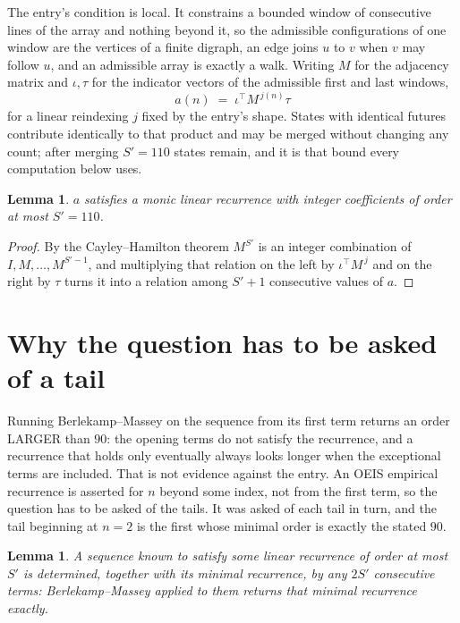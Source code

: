 \documentclass[11pt,a4paper]{article}
\theoremstyle{plain}
\newtheorem{lemma}[theorem]{Lemma}
\theoremstyle{definition}
\begin{document}
The entry's condition is local. It constrains a bounded window of consecutive lines of the
array and nothing beyond it, so the admissible configurations of one window are the vertices of
a finite digraph, an edge joins $u$ to $v$ when $v$ may follow $u$, and an admissible array is
exactly a walk. Writing $M$ for the adjacency matrix and $\iota,\tau$ for the indicator vectors
of the admissible first and last windows,
\[
a(n)\;=\;\iota^{\!\top}M^{\,j(n)}\tau
\]
for a linear reindexing $j$ fixed by the entry's shape. States with identical futures
contribute identically to that product and may be merged without changing any count; after
merging $S'=110$ states remain, and it is that bound every computation below uses.

\begin{lemma}\label{lem:cf}
$a$ satisfies a monic linear recurrence with integer coefficients of order at most $S'=110$.
\end{lemma}

\begin{proof}
By the Cayley--Hamilton theorem $M^{S'}$ is an integer combination of $I,M,\dots,M^{S'-1}$,
and multiplying that relation on the left by $\iota^{\!\top}M^{\,j}$ and on the right by
$\tau$ turns it into a relation among $S'+1$ consecutive values of $a$.
\end{proof}

\section{Why the question has to be asked of a tail}

Running Berlekamp--Massey on the sequence from its first term returns an order LARGER than $90$: the opening terms do not satisfy the recurrence, and a recurrence that holds only eventually always looks longer when the exceptional terms are included. That is not evidence against the entry. An OEIS empirical recurrence is asserted for $n$ beyond some index, not from the first term, so the question has to be asked of the tails. It was asked of each tail in turn, and the tail beginning at $n=2$ is the first whose minimal order is exactly the stated $90$.

\begin{lemma}\label{lem:bm}
A sequence known to satisfy some linear recurrence of order at most $S'$ is determined,
together with its minimal recurrence, by any $2S'$ consecutive terms: Berlekamp--Massey applied
to them returns that minimal recurrence exactly.
\end{lemma}
\end{document}
